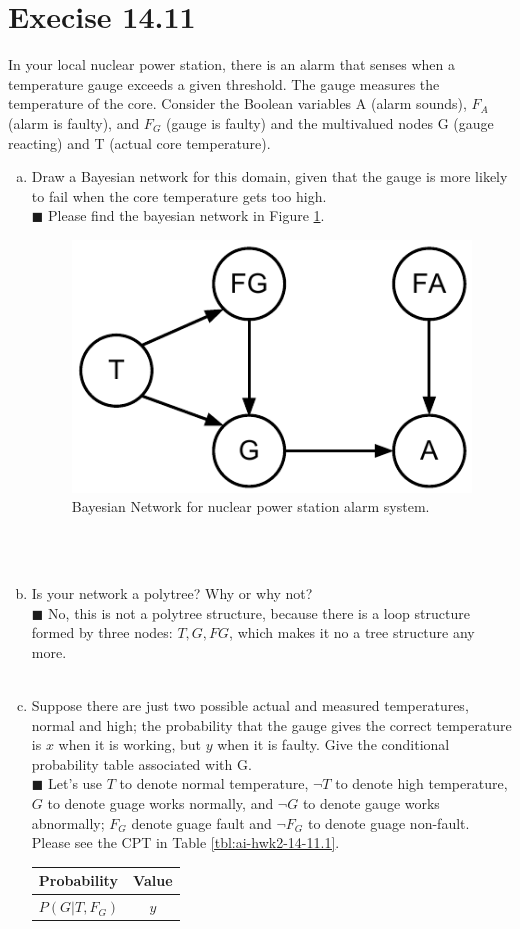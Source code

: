 \documentclass{article}
\newcommand{\solution}[1]{~\\ $\blacksquare$ \sffamily\upshape\selectfont #1
\normalfont ~\\~ }
\begin{document}
\section{Execise 14.11}
In your local nuclear power station, there is an alarm that senses
when a temperature gauge exceeds a given threshold. The gauge measures
the temperature of the core. Consider the Boolean variables A (alarm
sounds), $F_A$ (alarm is faulty), and $F_G$ (gauge is faulty) and the
multivalued nodes G (gauge reacting) and T (actual core temperature).
\begin{enumerate}[a.]
\item Draw a Bayesian network for this domain, given that the gauge is
  more likely to fail when the core temperature gets too high.
\solution{
  Please find the bayesian network in Figure \ref{fig:3}. 
  \begin{figure}[ht]
    \centering
    \includegraphics[width=.3\textwidth]{AI-HWK-2_14_11.pdf}
    \caption{Bayesian Network for nuclear power station alarm system.} 
    \label{fig:3}
  \end{figure} }
\item Is your network a polytree? Why or why not?
\solution{No, this is not a polytree structure, because there is a loop
structure formed by three nodes: $T, G, FG$, which makes it no a tree
structure any more. }
\item Suppose there are just two possible actual and measured
  temperatures, normal and high; the probability that the gauge gives
  the correct temperature is $x$ when it is working, but $y$ when it is
  faulty. Give the conditional probability table associated with G.
  \solution{Let's use $T$ to denote normal temperature, $\neg T$ to
    denote high temperature, $G$ to denote guage works normally, and
    $\neg G$ to denote gauge works abnormally; $F_G$ denote guage
    fault and $\neg F_G$ to denote guage non-fault. 
    Please see the CPT in Table \ref{tbl:ai-hwk2-14-11.1}.
    \begin{table}[h]
      \centering
      \begin{tabular}{lc}
        \toprule
        \textbf{Probability} & \textbf{Value} \\ \toprule
        $P(G|T,F_G)$ & $y$ \\ \midrule

\end{tabular}
\end{table}}
\end{enumerate}
\end{document}
